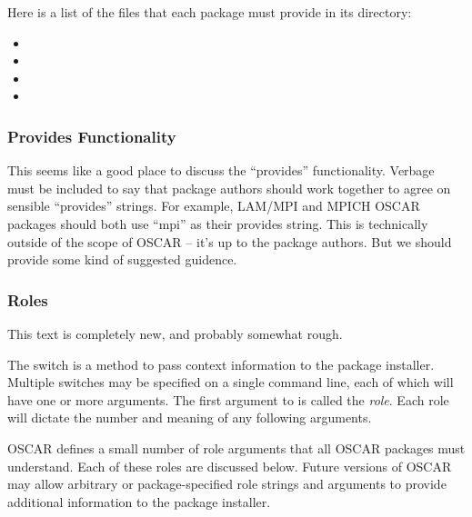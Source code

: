 Here is a list of the files that each package must provide in its
directory:

\begin{itemize}
\item {}
\item {}
\item {}
\item {}
\end{itemize}

\subsubsection{Provides Functionality}

\begin{discuss}
  This seems like a good place to discuss the ``provides''
  functionality.  Verbage must be included to say that package authors
  should work together to agree on sensible ``provides'' strings.  For
  example, LAM/MPI and MPICH OSCAR packages should both use ``mpi'' as
  their provides string.  This is technically outside of the scope of
  OSCAR -- it's up to the package authors.  But we should provide some
  kind of suggested guidence.
\end{discuss}

\subsubsection{Roles}

\begin{discuss}
  This text is completely new, and probably somewhat rough.
\end{discuss}

The  switch is a method to pass context information to the
package installer.  Multiple  switches may be specified on
a single command line, each of which will have one or more arguments.
The first argument to  is called the {\em role}.  Each
role will dictate the number and meaning of any following arguments.

OSCAR defines a small number of role arguments that all OSCAR packages
must understand.  Each of these roles are discussed below.  Future
versions of OSCAR may allow arbitrary or package-specified role
strings and arguments to provide additional information to the package
installer.

